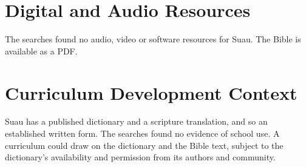 \documentclass[12pt]{article}
\begin{document}
\section{Digital and Audio Resources}
The searches found no audio, video or software resources for Suau. The Bible is available as a PDF.

\section{Curriculum Development Context}
Suau has a published dictionary and a scripture translation, and so an established written form. The searches found no evidence of school use. A curriculum could draw on the dictionary and the Bible text, subject to the dictionary's availability and permission from its authors and community.
\end{document}
